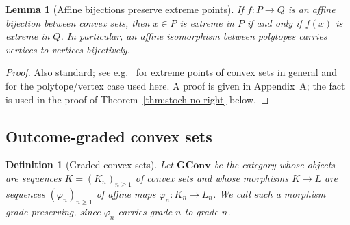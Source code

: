 \documentclass[11pt]{article}
\newtheorem{lemma}[theorem]{Lemma}
\newtheorem{definition}[theorem]{Definition}
\begin{document}
\begin{lemma}[Affine bijections preserve extreme points]
\label{lem:affine-extreme}
If $f:P\to Q$ is an affine bijection between convex sets, then $x\in P$ is
extreme in $P$ if and only if $f(x)$ is extreme in $Q$. In particular, an
affine isomorphism between polytopes carries vertices to vertices
bijectively.
\end{lemma}

\begin{proof}
Also standard; see e.g.\ \cite[\S18]{Rockafellar1970} for extreme points of
convex sets in general and \cite[\S2.3]{Ziegler1995} for the polytope/vertex
case used here. A proof is given in Appendix~A; the fact is used in the proof
of Theorem~\ref{thm:stoch-no-right} below.
\end{proof}

\subsection{Outcome-graded convex sets}

\begin{definition}[Graded convex sets]
Let $\mathbf{GConv}$ be the category whose objects are sequences
$K=(K_n)_{n\ge1}$ of convex sets and whose morphisms $K\to L$ are sequences
$(\varphi_n)_{n\ge1}$ of affine maps $\varphi_n:K_n\to L_n$. We call such a
morphism grade-preserving, since $\varphi_n$ carries grade $n$ to grade $n$.
\end{definition}
\end{document}
